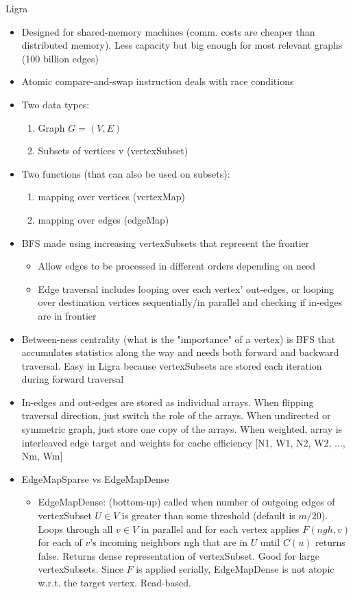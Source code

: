 Ligra
\begin{itemize}
    \item Designed for shared-memory machines (comm. costs are cheaper than distributed memory). Less capacity but big enough for most relevant graphs (100 billion edges)
    \item Atomic compare-and-swap instruction deals with race conditions
    \item Two data types:
    \begin{enumerate}
        \item Graph $G = (V, E)$
        \item Subsets of vertices v (vertexSubset)
    \end{enumerate}
    \item Two functions (that can also be used on subsets):
    \begin{enumerate}
        \item mapping over vertices (vertexMap)
        \item mapping over edges (edgeMap)
    \end{enumerate}
    \item BFS made using increasing vertexSubsets that represent the frontier
    \begin{itemize}
        \item Allow edges to be processed in different orders depending on need
        \item Edge traversal includes looping over each vertex' out-edges, or looping over destination vertices sequentially/in parallel and checking if in-edges are in frontier
    \end{itemize}
    \item Between-ness centrality (what is the "importance" of a vertex) is BFS that accumulates statistics along the way and needs both forward and backward traversal. Easy in Ligra because vertexSubsets are stored each iteration during forward traversal
    \item In-edges and out-edges are stored as individual arrays. When flipping traversal direction, just switch the role of the arrays. When undirected or symmetric graph, just store one copy of the arrays. When weighted, array is interleaved edge target and weights for cache efficiency [N1, W1, N2, W2, ..., Nm, Wm]
    \item EdgeMapSparse vs EdgeMapDense
    \begin{itemize}
        \item EdgeMapDense: (bottom-up) called when number of outgoing edges of vertexSubset $U \in V$ is greater than some threshold (default is $m/20$). Loops through all $v \in V$ in parallel and for each vertex applies $F(ngh, v)$ for each of $v$'s incoming neighbors ngh that are in $U$ until $C(u)$ returns false. Returns dense representation of vertexSubset. Good for large vertexSubsets. Since $F$ is applied serially, EdgeMapDense is not atopic w.r.t. the target vertex. Read-based. 

\end{itemize}
\end{itemize}

